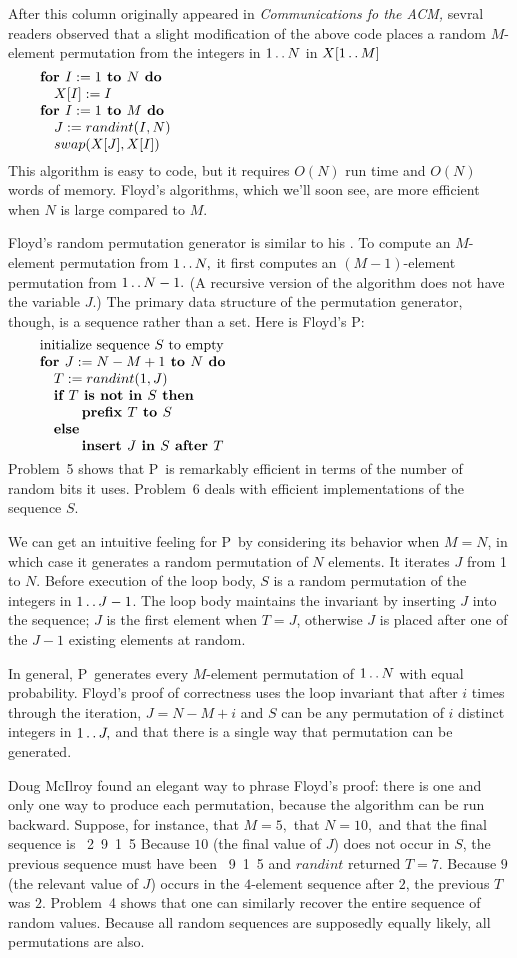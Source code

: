 After this column originally appeared in {\sl Communications fo the ACM,\/}
sevral readers observed that a slight modification of the above code places a
random $M$-element permutation from the integers in $1\mathinner{\ldotp\ldotp} N$ in
$X[1\mathinner{\ldotp\ldotp} M]$
$$\vbox{\let\par=\endgraf
\obeylines\sfcode`;=3000
{\bf for $I:=1$ to $N$ do}
\quad $X[I]:=I$
{\bf for $I:=1$ to $M$ do}
\quad $J:= randint(I, N)$
\quad $swap(X[J], X[I])$
}$$
This algorithm is easy to code, but it requires $O(N)$ run time and $O(N)$ words
of memory. Floyd's algorithms, which we'll soon see, are more efficient when $N$
is large compared to $M$.

Floyd's random permutation generator is similar to his . To compute an
$M$-element permutation from $1\mathinner{\ldotp\ldotp} N,$ it first computes an $(M-1)$-element
permutation from $1\mathinner{\ldotp\ldotp} N-1.$ (A recursive version of the algorithm does not
have the variable $J.$) The primary data structure of the permutation generator,
though, is a sequence rather than a set. Here is Floyd's \alg P:
$$\vbox{\let\par=\endgraf
\obeylines\sfcode`;=3000
initialize sequence $S$ to empty
{\bf for $J:=N-M+1$ to $N$ do}
\quad $T:=randint(1,J)$
\quad {\bf if $T$ is not in $S$ then}
\qquad\quad {\bf prefix $T$ to $S$}
\quad {\bf else}
\qquad\quad {\bf insert $J$ in $S$ after $T$}
}$$
Problem~5 shows that \alg P\ is remarkably efficient in terms of the number of
random bits it uses. Problem~6 deals with efficient implementations of the
sequence $S.$

We can get an intuitive feeling for \alg P\ by considering its behavior when
$M=N$, in which case it generates a random permutation of $N$ elements. It
iterates $J$ from 1 to $N$. Before execution of the loop body, $S$ is a random
permutation of the integers in $1\mathinner{\ldotp\ldotp} J-1$. The loop body maintains the
invariant by inserting $J$ into the sequence; $J$ is the first element when
$T=J$, otherwise $J$ is placed after one of the $J-1$ existing elements at random.

In general, \alg P\ generates every $M$-element permutation of $1\mathinner{\ldotp\ldotp} N$ with
equal probability. Floyd's proof of correctness uses the loop invariant that
after $i$ times through the iteration, $J=N-M+i$ and $S$ can be any permutation
of $i$ distinct integers in $1\mathinner{\ldotp\ldotp} J,$ and that there is a single way that
permutation can be generated.

Doug McIlroy found an elegant way to phrase Floyd's proof: there is one and only
one way to produce each permutation, because the algorithm can be run backward.
Suppose, for instance, that $M=5,$ that $N=10,$ and that the final sequence is
\ 2\ 9\ 1\ 5
\enddisplay
Because $10$ (the final value of $J$) does not occur in $S$, the previous
sequence must have been
\ 9\ 1\ 5
\enddisplay
and $randint$ returned $T=7.$ Because $9$ (the relevant value of $J$) occurs in
the $4$-element sequence after $2$, the previous $T$ was $2$. Problem~4 shows
that one can similarly recover the entire sequence of random values. Because all
random sequences are supposedly equally likely, all permutations are also.

